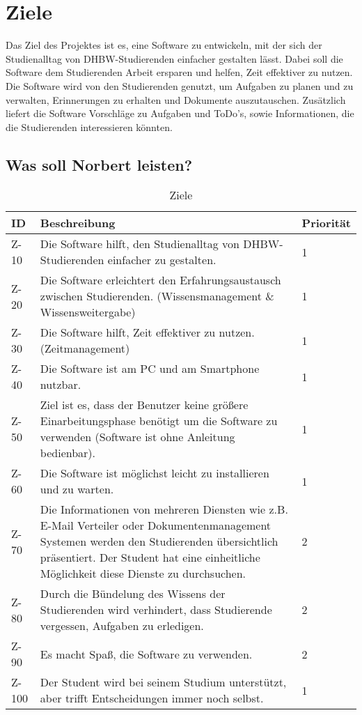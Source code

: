 
\chapter{Ziele}
Das Ziel des Projektes ist es, eine Software zu entwickeln, mit der sich der Studienalltag von DHBW-Studierenden einfacher gestalten lässt. Dabei soll die Software dem Studierenden Arbeit ersparen und helfen, Zeit effektiver zu nutzen. Die Software wird von den Studierenden genutzt, um  Aufgaben zu planen und zu verwalten, Erinnerungen zu erhalten und Dokumente auszutauschen. Zusätzlich liefert die Software Vorschläge zu Aufgaben und ToDo's, sowie Informationen, die die Studierenden interessieren könnten. 

\section{Was soll Norbert leisten?}
\begin{table}[H]
\caption{Ziele}
\label{ziele:entwicklungsziele}
\begin{tabularx}{\textwidth}{|l|X|l|}
\toprule
\textbf{ID} & \textbf{Beschreibung} & \textbf{Priorität}\\
\endhead
\hline
Z-10 & Die Software hilft, den Studienalltag von DHBW-Studierenden einfacher zu gestalten. & 1 \\
Z-20 & Die Software erleichtert den Erfahrungsaustausch zwischen Studierenden. (Wissensmanagement \& Wissensweitergabe) & 1 \\
Z-30 & Die Software hilft, Zeit effektiver zu nutzen. (Zeitmanagement) & 1\\
Z-40 & Die Software ist am PC und am Smartphone nutzbar. & 1\\
Z-50 & Ziel ist es, dass der Benutzer keine größere Einarbeitungsphase benötigt um die Software zu verwenden (Software ist ohne Anleitung bedienbar). & 1 \\
Z-60 & Die Software ist möglichst leicht zu installieren und zu warten. & 1 \\
Z-70 & Die Informationen von mehreren Diensten wie z.B. E-Mail Verteiler oder Dokumentenmanagement Systemen werden den Studierenden übersichtlich präsentiert. Der Student hat eine einheitliche Möglichkeit diese Dienste zu durchsuchen. & 2 \\
Z-80 & Durch die Bündelung des Wissens der Studierenden wird verhindert, dass Studierende vergessen, Aufgaben zu erledigen. & 2 \\
Z-90 & Es macht Spaß, die Software zu verwenden. & 2 \\
Z-100 & Der Student wird bei seinem Studium unterstützt, aber trifft Entscheidungen immer noch selbst. & 1 \\
\hline
\end{tabularx}
\end{table}


